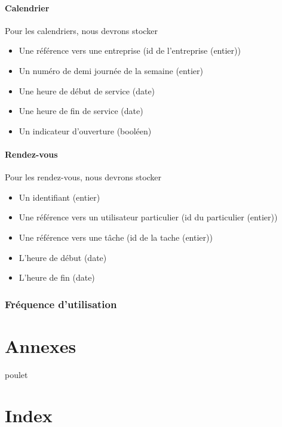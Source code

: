 \documentclass{article}
\begin{document}
\paragraph{Calendrier}
Pour les calendriers, nous devrons stocker
\begin{itemize}
\item Une référence vers une entreprise (id de l'entreprise (entier))
\item Un numéro de demi journée de la semaine (entier)
\item Une heure de début de service (date)
\item Une heure de fin de service (date)
\item Un indicateur d'ouverture (booléen)
\end{itemize}

\paragraph{Rendez-vous}
Pour les rendez-vous, nous devrons stocker
\begin{itemize}
\item Un identifiant (entier)
\item Une référence vers un utilisateur particulier (id du particulier (entier))
\item Une référence vers une tâche (id de la tache (entier))
\item L'heure de début (date)
\item L'heure de fin (date)
\end{itemize}

\subsubsection{Fréquence d'utilisation}


\section{Annexes}
poulet
\section{Index}
\end{document}
